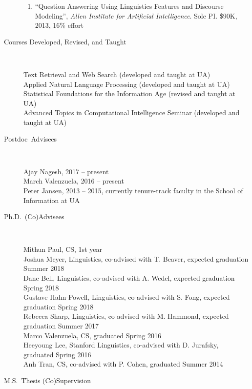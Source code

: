 \documentclass[10pt]{article}
\newcommand{\ve}[1]{{\em #1}} %
\newcommand{\ti}[1]{``#1''} %
\begin{document}
\begin{description}
\begin{enumerate}
\item \ti{Question Answering Using Linguistics Features and Discourse Modeling}, \ve{Allen Institute for Artificial Intelligence}. Sole PI. \$90K, 2013, 16\% effort

\end{enumerate}

\vspace{-.1cm}\item [Courses Developed, Revised, and Taught]\
	
Text Retrieval and Web Search (developed and taught at UA)\\
Applied Natural Language Processing  (developed and taught at UA)\\
Statistical Foundations for the Information Age (revised and taught at UA)\\
Advanced Topics in Computational Intelligence Seminar (developed and taught at UA)

\vspace{-.1cm}\item [Postdoc~Advisees]\

Ajay Nagesh, 2017 -- present\\
March Valenzuela, 2016 -- present\\
Peter Jansen, 2013 -- 2015, currently tenure-track faculty in the School of Information at UA

\vspace{-.1cm}\item [Ph.D.~(Co)Advisees]\

Mithun Paul, CS, 1st year \\
Joshua Meyer, Linguistics, co-advised with T. Beaver, expected graduation Summer 2018 \\
Dane Bell, Linguistics, co-advised with A. Wedel, expected graduation Spring 2018 \\
Gustave Hahn-Powell, Linguistics, co-advised with S. Fong, expected graduation Spring 2018 \\
Rebecca Sharp, Linguistics, co-advised with M. Hammond, expected graduation Summer 2017 \\
Marco Valenzuela, CS, graduated Spring 2016 \\
Heeyoung Lee, Stanford Linguistics, co-advised with D. Jurafsky, graduated Spring 2016 \\
Anh Tran, CS, co-advised with P. Cohen, graduated Summer 2014

\vspace{-.1cm}\item [M.S.~Thesis (Co)Supervision ]\


\end{description}
\end{document}
